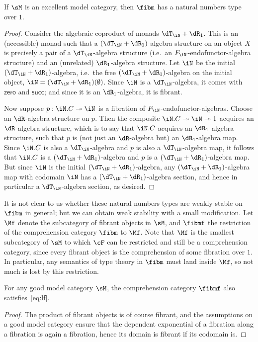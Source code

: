 \documentclass[referee]{psp}
\let\N\iN
\def\zero{\mathsf{zero}}
\def\succ{\mathsf{succ}}
\begin{document}
\begin{thm}
  If $\sM$ is an excellent model category, then $\fibm$ has a natural numbers type over $1$.
\end{thm}
\begin{proof}
  Consider the algebraic coproduct of monads $\dT_\N+\dR_1$.
  This is an (accessible) monad such that a $(\dT_\N+\dR_1)$-algebra structure on an object $X$ is precisely a pair of a $\dT_\N$-algebra structure (i.e.\ an $F_\N$-endofunctor-algebra structure) and an (unrelated) $\dR_1$-algebra structure.
  Let $\N$ be the initial $(\dT_\N+\dR_1)$-algebra, i.e.\ the free $(\dT_\N+\dR_1)$-algebra on the initial object, $\N =(\dT_\N+\dR_1)(\emptyset)$.
  Since $\N$ is a $\dT_\N$-algebra, it comes with $\zero$ and $\succ$; and since it is an $\dR_1$-algebra, it is fibrant.

  Now suppose $p:\N.C\fib \N$ is a fibration of $F_\N$-endofunctor-algebras.
  Choose an $\dR$-algebra structure on $p$.
  Then the composite $\N.C\fib\N\fib 1$ acquires an $\dR$-algebra structure, which is to say that $\N.C$ acquires an $\dR_1$-algebra structure, such that $p$ is (not just an $\dR$-algebra but) an $\dR_1$-algebra map.
  Since $\N.C$ is also a $\dT_\N$-algebra and $p$ is also a $\dT_\N$-algebra map, it follows that $\N.C$ is a $(\dT_\N+\dR_1)$-algebra and $p$ is a $(\dT_\N+\dR_1)$-algebra map.
  But since $\N$ is the initial $(\dT_\N+\dR_1)$-algebra, any $(\dT_\N+\dR_1)$-algebra map with codomain $\N$ has a $(\dT_\N+\dR_1)$-algebra section, and hence in particular a $\dT_\N$-algebra section, as desired.
\end{proof}

It is not clear to us whether these natural numbers types are weakly stable on $\fibm$ in general; but we can obtain weak stability with a small modification.
Let $\Mf$ denote the subcategory of fibrant objects in $\sM$, and $\fibmf$ the restriction of the comprehension category $\fibm$ to $\Mf$.
Note that $\Mf$ is the smallest subcategory of $\sM$ to which $\cF$ can be restricted and still be a comprehension category, since every fibrant object is the comprehension of some fibration over $1$.
In particular, any semantics of type theory in $\fibm$ must land inside $\Mf$, so not much is lost by this restriction.

\begin{lem}
  For any good model category $\sM$, the comprehension category $\fibmf$ also satisfies~\eqref{eq:lf}.
\end{lem}
\begin{proof}
  The product of fibrant objects is of course fibrant, and the assumptions on a good model category ensure that the dependent exponential of a fibration along a fibration is again a fibration, hence its domain is fibrant if its codomain is.
\end{proof}
\end{document}
